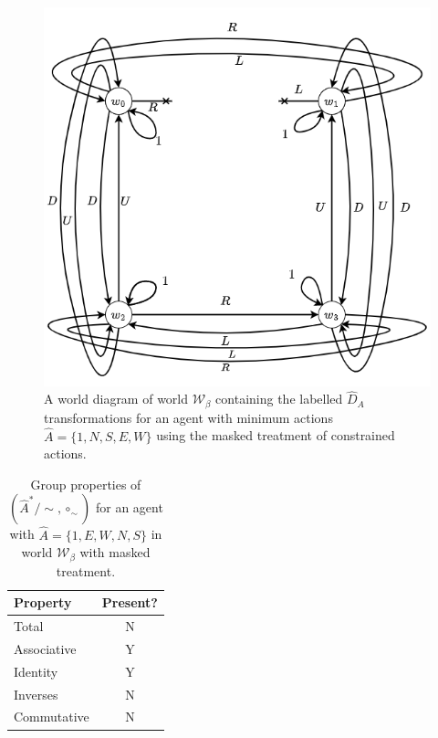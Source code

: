 \begin{figure}[H]
    \centering
    \includegraphics[width=0.75\linewidth]{5BeyondSBDRL/GlobalAlgebras/Images/masked_walls_2x2_cyclical_min_actions.drawio.png}
    \caption{
    A world diagram of world $\mathscr{W}_{\beta}$ containing the labelled $\hat{D}_{A}$ transformations for an agent with minimum actions $\hat{A} = \{1, N, S, E, W\}$ using the masked treatment of constrained actions.
    }
    \label{fig:2x2_gridworld_minimum_transformations_wall_masked}
\end{figure}

\begin{table}[H]
\centering
\begin{tabular}{lc}
\hline
\textbf{Property} & \textbf{Present?} \\
\hline
Total & N \\
Associative & Y \\
Identity & Y \\
Inverses & N \\
\hline
Commutative & N \\
\end{tabular}
\caption{
Group properties of $(\hat{A}^{*}/\sim, \circ_{\sim})$ for an agent with $\hat{A} = \{1, E, W, N, S \}$ in world $\mathscr{W}_{\beta}$ with masked treatment.
}
\end{table}



\begin{fullwidth}
\begin{landscape}
\setlength{\tabcolsep}{2pt}
{\fontsize{8}{10}\selectfont

}
\setlength{\tabcolsep}{6pt}
\end{landscape}
\end{fullwidth}


